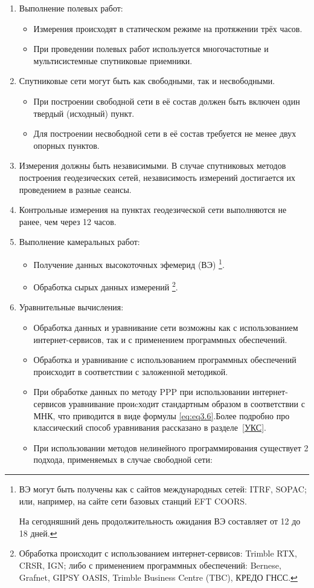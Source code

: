 \begin{enumerate}
	\item Выполнение полевых работ: 
	\begin{itemize}
		\item Измерения происходят в статическом режиме на протяжении трёх часов.
		\item При проведении полевых работ используется многочастотные и мультисистемные спутниковые приемники.
	\end{itemize}
	\item Спутниковые сети могут быть как свободными, так и несвободными.
	\begin{itemize}
		\item При построении свободной сети в её состав должен быть включен один твердый (исходный) пункт.
		\item Для построении несвободной сети в её состав требуется не менее двух опорных пунктов.
	\end{itemize}
	\item Измерения должны быть независимыми. В случае спутниковых методов построения геодезических сетей, независимость измерений достигается их проведением в разные сеансы.
	\item Контрольные измерения на пунктах геодезической сети выполняются не ранее, чем через 12 часов.
	\item Выполнение камеральных работ:
	\begin{itemize}
		\item Получение данных высокоточных эфемерид (ВЭ)
			\footnote{
				ВЭ могут быть получены как с сайтов международных сетей: ITRF, SOPAC; или, например, на сайте сети базовых станций EFT COORS. 
				
				На сегодняшний день продолжительность ожидания ВЭ составляет от 12 до 18 дней.
			}.
		\item Обработка сырых данных измерений
			\footnote{
				Обработка происходит с использованием интернет-сервисов: Trimble RTX, CRSR, IGN; либо с применением программных обеспечений: Bernese, Grafnet, GIPSY OASIS, Trimble Business Centre (TBC), КРЕДО ГНСС.
			}.
		
	\end{itemize}
	\item Уравнительные вычисления:
	\begin{itemize}
		\item Обработка данных и уравнивание сети возможны как с использованием интернет-сервисов, так и с применением программных обеспечений.
		\item Обработка и уравнивание с использованием программных обеспечений происходит в соответствии с заложенной методикой.
		\item При обработке данных по методу PPP при использовании интернет-сервисов уравнивание проиcходит стандартным образом в соответствии с МНК,  что приводится в виде формулы \cref{eq:eq3.6}.\newline Более подробно про классический способ уравнивания рассказано в разделе~\cref{УКС}.
		\item При использовании методов нелинейного программирования существует 2 подхода, применяемых в случае свободной сети:


\end{itemize}
\end{enumerate}

